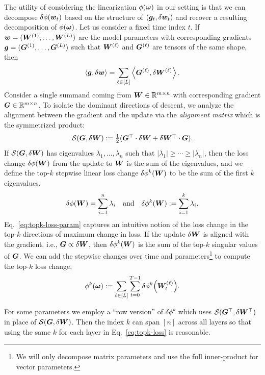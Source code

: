 The utility of considering the linearization $\phi(\bm{\omega})$ in our setting is that we can decompose $\delta \phi({\boldsymbol w}_t)$ based on the structure of $({\boldsymbol g}_t, \delta {\boldsymbol w}_t)$ and recover a resulting decomposition of $\phi(\bm{\omega})$. Let us consider a fixed time index $t$. If ${\boldsymbol w} = ({\boldsymbol W}^{(1)}, \ldots, {\boldsymbol W}^{(L)})$ are the model parameters with corresponding gradients ${\boldsymbol g} = ({\boldsymbol G}^{(1)}, \ldots, {\boldsymbol G}^{(L)})$ such that ${\boldsymbol W}^{(\ell)}$ and ${\boldsymbol G}^{(\ell)}$ are tensors of the same shape, then 
\[
    \left\langle {\boldsymbol g}, \delta {\boldsymbol w} \right\rangle = \sum\limits_{\ell \in [L]} \left\langle {\boldsymbol G}^{(\ell)}, \delta {\boldsymbol W}^{(\ell)} \right\rangle.
\]
Consider a single summand coming from ${\boldsymbol W} \in \mathbb{R}^{m \times n}$ with corresponding gradient ${\boldsymbol G} \in \mathbb{R}^{m \times n}$. To
isolate the dominant directions of descent, we analyze the alignment between the gradient and the update via the \emph{alignment matrix} which is the symmetrized product:
\begin{equation}\label{eq:alignmat}
    \mathcal{S}({\boldsymbol G}, \delta {\boldsymbol W}) := \textstyle\frac{1}{2}({\boldsymbol G}^\top \cdot \delta {\boldsymbol W} + \delta {\boldsymbol W}^\top \cdot {\boldsymbol G}).
\end{equation}
If $\mathcal{S}({\boldsymbol G}, \delta {\boldsymbol W})$ has eigenvalues $\lambda_1, \ldots, \lambda_n$ such that $|\lambda_1| \geq \cdots \geq |\lambda_n|$, then the loss change $\delta \phi({\boldsymbol W})$ from the update to ${\boldsymbol W}$ is the sum of the eigenvalues, and we define the top-$k$ stepwise linear loss change $\delta \phi^k({\boldsymbol W})$ to be the sum of the first $k$ eigenvalues.
\begin{equation}\label{eq:topk-loss-param}
    \delta \phi({\boldsymbol W}) = \sum\limits_{i=1}^n \lambda_i~~ \text{ and }~~ \delta \phi^k({\boldsymbol W}) := \sum\limits_{i = 1}^k \lambda_i.
\end{equation}
Eq.\ \eqref{eq:topk-loss-param} captures an intuitive notion of the loss change in the top-$k$ directions of maximum change in loss. If the update $\delta {\boldsymbol W}$ is aligned with the gradient, i.e., ${\boldsymbol G} \propto  \delta {\boldsymbol W}$, then $\delta \phi^k({\boldsymbol W})$ is the sum of the top-$k$ singular values of ${\boldsymbol G}$. We can add the stepwise changes over time and parameters\footnote{We will only decompose matrix parameters and use the full inner-product for vector parameters. \vspace{-2mm}} to compute the top-$k$ loss change, 
\begin{equation}\label{eq:topk-loss}
    \phi^k(\bm{\omega}) := \sum\limits_{\ell \in [L]} \sum\limits_{t = 0}^{T-1} \delta \phi^k\qty({\boldsymbol W}^{(\ell)}_t). 
\end{equation}

For some parameters we employ a ``row version'' of $\delta \phi^k$ which uses $\mathcal{S}({\boldsymbol G}^\top, \delta {\boldsymbol W}^\top)$ in place of $\mathcal{S}({\boldsymbol G}, \delta {\boldsymbol W})$. Then the index $k$ can span $[n]$ across all layers so that using the same $k$ for each layer in Eq.\ \eqref{eq:topk-loss} is reasonable.  

